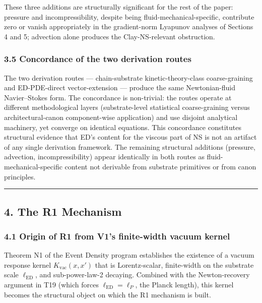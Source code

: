 \documentclass[
  11pt,a4paper]{article}
\begin{document}
These three additions are structurally significant for the rest of the
paper: pressure and incompressibility, despite being
fluid-mechanical-specific, contribute zero or vanish appropriately in
the gradient-norm Lyapunov analyses of Sections 4 and 5; advection alone
produces the Clay-NS-relevant obstruction.

\subsubsection{3.5 Concordance of the two derivation
routes}\label{concordance-of-the-two-derivation-routes}

The two derivation routes --- chain-substrate kinetic-theory-class
coarse-graining and ED-PDE-direct vector-extension --- produce the same
Newtonian-fluid Navier--Stokes form. The concordance is non-trivial: the
routes operate at different methodological layers (substrate-level
statistical coarse-graining versus architectural-canon component-wise
application) and use disjoint analytical machinery, yet converge on
identical equations. This concordance constitutes structural evidence
that ED's content for the viscous part of NS is not an artifact of any
single derivation framework. The remaining structural additions
(pressure, advection, incompressibility) appear identically in both
routes as fluid-mechanical-specific content not derivable from substrate
primitives or from canon principles.

\begin{center}\rule{0.5\linewidth}{0.5pt}\end{center}

\subsection{4. The R1 Mechanism}\label{the-r1-mechanism}

\subsubsection{4.1 Origin of R1 from V1's finite-width vacuum
kernel}\label{origin-of-r1-from-v1s-finite-width-vacuum-kernel}

Theorem N1 of the Event Density program establishes the existence of a
vacuum response kernel \(K_\mathrm{vac}(x, x')\) that is Lorentz-scalar,
finite-width on the substrate scale \(\ell_\mathrm{ED}\), and
sub-power-law-2 decaying. Combined with the Newton-recovery argument in
T19 (which forces \(\ell_\mathrm{ED} = \ell_P\), the Planck length),
this kernel becomes the structural object on which the R1 mechanism is
built.
\end{document}
